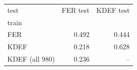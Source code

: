 \begin{tabular}{lrr}
\toprule
test & FER test & KDEF test \\
train &  &  \\
\midrule
FER & 0.492 & 0.444 \\
KDEF & 0.218 & 0.628 \\
KDEF (all 980) & 0.236 & -- \\
\bottomrule
\end{tabular}
